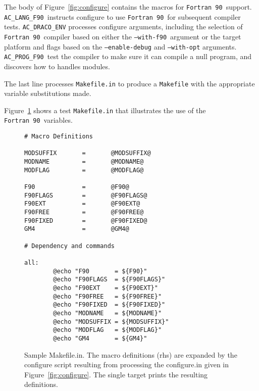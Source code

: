 \documentclass[11pt]{nmemo}
\newcommand{\fninety}{\texttt{Fortran~90}}
\newcommand{\withfninety}{\texttt{--with-f90}}
\newcommand{\langfninety}{\texttt{AC\_LANG\_F90}}
\newcommand{\progfninety}{\texttt{AC\_PROG\_F90}}
\begin{document}
The body of Figure~\ref{fig:configure} contains the macros for
\fninety\ support.  \langfninety\ instructs configure to use \fninety\
for subsequent compiler tests.  \texttt{AC\_DRACO\_ENV} processes
configure arguments, including the selection of \fninety\ compiler
based on either the \withfninety\ argument or the target platform and
flags based on the \texttt{--enable-debug} and \texttt{--with-opt}
arguments.  \progfninety\ test the compiler to make sure it can
compile a null program, and discovers how to handles modules.

The last line processes \texttt{Makefile.in} to produce a
\texttt{Makefile} with the appropriate variable substitutions made.

Figure~\ref{fig:makefile} shows a test \texttt{Makefile.in} that
illustrates the use of the \fninety\ variables.  
\begin{figure}[phbt]
\hrulefill
\begin{verbatim}
# Macro Definitions

MODSUFFIX       =       @MODSUFFIX@
MODNAME         =       @MODNAME@
MODFLAG         =       @MODFLAG@

F90             =       @F90@
F90FLAGS        =       @F90FLAGS@
F90EXT          =       @F90EXT@
F90FREE         =       @F90FREE@
F90FIXED        =       @F90FIXED@
GM4             =       @GM4@

# Dependency and commands

all:
        @echo "F90       = ${F90}"
        @echo "F90FLAGS  = ${F90FLAGS}"
        @echo "F90EXT    = ${F90EXT}"
        @echo "F90FREE   = ${F90FREE}"
        @echo "F90FIXED  = ${F90FIXED}"
        @echo "MODNAME   = ${MODNAME}"
        @echo "MODSUFFIX = ${MODSUFFIX}"
        @echo "MODFLAG   = ${MODFLAG}"
        @echo "GM4       = ${GM4}"
\end{verbatim}%
\caption{Sample Makefile.in.  The macro definitions (rhs) are expanded
by the configure script resulting from processing the configure.in
given in Figure~\ref{fig:configure}.  The single target prints the
resulting definitions.}\label{fig:makefile} \hrulefill
\end{figure}
\end{document}
